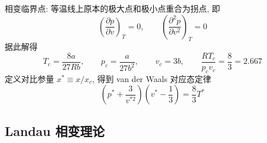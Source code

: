 \documentclass[12pt,a4paper]{article}%
\numberwithin{equation}{section}
\begin{document}
相变临界点: 等温线上原本的极大点和极小点重合为拐点, 即
\begin{equation}
    \left(\frac{\partial p}{\partial v}\right)_T = 0,\qquad 
    \left(\frac{\partial^2 p}{\partial v^2}\right)_T = 0
\end{equation}
据此解得
\begin{equation}
    T_c = \frac{8a}{27Rb},\qquad p_c = \frac{a}{27b^2},\qquad
    v_c = 3b,\qquad \frac{RT_c}{p_cv_c} = \frac 83 = 2.667
\end{equation}
定义对比参量 $x^*\equiv x/x_c$, 得到 van der Waals 对应态定律
\begin{equation}
    \left(p^* + \frac{3}{v^{*2}}\right)\left(v^*-\frac 13\right) = \frac 83 T^*
\end{equation}
\subsection{Landau 相变理论} %
\label{sub:landau_transi}
\end{document}
